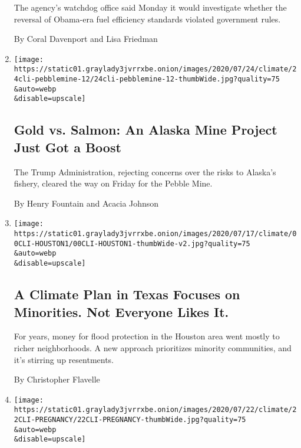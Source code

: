 \begin{enumerate}
  The agency's watchdog office said Monday it would investigate whether
  the reversal of Obama-era fuel efficiency standards violated
  government rules.

  By Coral Davenport and Lisa Friedman
\item
  \href{/2020/07/24/climate/pebble-mine-alaska-environment.html}{}

  \texttt{[image: https://static01.graylady3jvrrxbe.onion/images/2020/07/24/climate/24cli-pebblemine-12/24cli-pebblemine-12-thumbWide.jpg?quality=75\\\&auto=webp\\\&disable=upscale]}

  \hypertarget{gold-vs-salmon-an-alaska-mine-project-just-got-a-boost}{%
  \subsection{Gold vs. Salmon: An Alaska Mine Project Just Got a
  Boost}\label{gold-vs-salmon-an-alaska-mine-project-just-got-a-boost}}

  The Trump Administration, rejecting concerns over the risks to
  Alaska's fishery, cleared the way on Friday for the Pebble Mine.

  By Henry Fountain and Acacia Johnson
\item
  \href{/2020/07/24/climate/houston-flooding-race.html}{}

  \texttt{[image: https://static01.graylady3jvrrxbe.onion/images/2020/07/17/climate/00CLI-HOUSTON1/00CLI-HOUSTON1-thumbWide-v2.jpg?quality=75\\\&auto=webp\\\&disable=upscale]}

  \hypertarget{a-climate-plan-in-texas-focuses-on-minorities-not-everyone-likes-it}{%
  \subsection{A Climate Plan in Texas Focuses on Minorities. Not
  Everyone Likes
  It.}\label{a-climate-plan-in-texas-focuses-on-minorities-not-everyone-likes-it}}

  For years, money for flood protection in the Houston area went mostly
  to richer neighborhoods. A new approach prioritizes minority
  communities, and it's stirring up resentments.

  By Christopher Flavelle
\item
  \href{/2020/07/22/climate/gas-flares-premature-babies.html}{}

  \texttt{[image: https://static01.graylady3jvrrxbe.onion/images/2020/07/22/climate/22CLI-PREGNANCY/22CLI-PREGNANCY-thumbWide.jpg?quality=75\\\&auto=webp\\\&disable=upscale]}


\end{enumerate}
